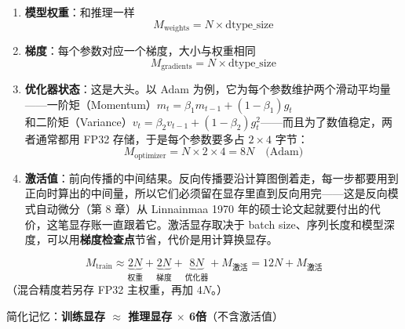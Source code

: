 \begin{enumerate}
    \item \textbf{模型权重}：和推理一样
    \begin{equation}
        M_{\text{weights}} = N \times \text{dtype\_size}
    \end{equation}
    
    \item \textbf{梯度}：每个参数对应一个梯度，大小与权重相同
    \begin{equation}
        M_{\text{gradients}} = N \times \text{dtype\_size}
    \end{equation}
    
        \item \textbf{优化器状态}：这是大头。以 Adam 为例，它为每个参数维护两个滑动平均量——一阶矩（Momentum）$m_t = \beta_1 m_{t-1} + (1-\beta_1) g_t$ 和二阶矩（Variance）$v_t = \beta_2 v_{t-1} + (1-\beta_2) g_t^2$——而且为了数值稳定，两者通常都用 FP32 存储，于是每个参数要多占 $2 \times 4$ 字节：
    \begin{equation}
        M_{\text{optimizer}} = N \times 2 \times 4 = 8N \quad \text{(Adam)}
    \end{equation}

    \item \textbf{激活值}：前向传播的中间结果。反向传播要沿计算图倒着走，每一步都要用到正向时算出的中间量，所以它们必须留在显存里直到反向用完——这是反向模式自动微分（第 8 章）从 Linnainmaa 1970 年的硕士论文起就要付出的代价，这笔显存账一直跟着它。激活显存取决于 batch size、序列长度和模型深度，可以用\textbf{梯度检查点}节省，代价是用计算换显存。
\end{enumerate}

\begin{keyformula}[title=全量微调显存估算]
\[
 M_{\text{train}} \approx \underbrace{2N}_{\text{权重}} + \underbrace{2N}_{\text{梯度}} + \underbrace{8N}_{\text{优化器}} + M_{\text{激活}} = 12N + M_{\text{激活}}
\]
（混合精度若另存 FP32 主权重，再加 $4N$。）

简化记忆：\textbf{训练显存 $\approx$ 推理显存 $\times$ 6倍}（不含激活值）
\end{keyformula}

